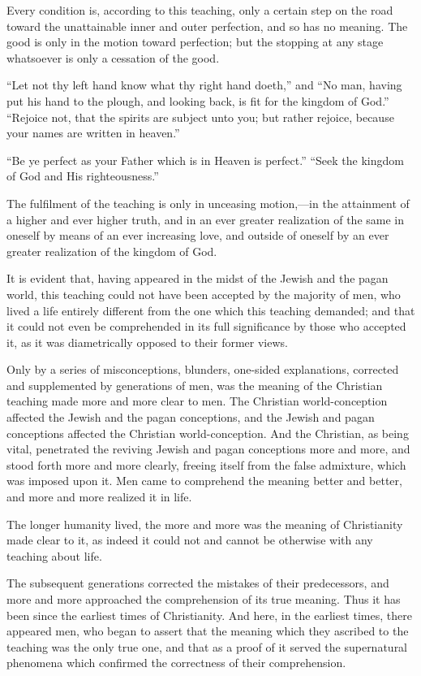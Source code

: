 \documentclass{book}
\begin{document}
Every condition is, according to this teaching, only a certain step on the road toward the unattainable inner and outer perfection, and so has no meaning. The good is only in the motion toward perfection; but the stopping at any stage whatsoever is only a cessation of the good.

“Let not thy left hand know what thy right hand doeth,” and “No man, having put his hand to the plough, and looking back, is fit for the kingdom of God.” “Rejoice not, that the spirits are subject unto you; but rather rejoice, because your names are written in heaven.”

“Be ye perfect as your Father which is in Heaven is perfect.” “Seek the kingdom of God and His righteousness.”

The fulfilment of the teaching is only in unceasing motion,—in the attainment of a higher and ever higher truth, and in an ever greater realization of the same in oneself by means of an ever increasing love, and outside of oneself by an ever greater realization of the kingdom of God.

It is evident that, having appeared in the midst of the Jewish and the pagan world, this teaching could not have been accepted by the majority of men, who lived a life entirely different from the one which this teaching demanded; and that it could not even be comprehended in its full significance by those who accepted it, as it was diametrically opposed to their former views.

Only by a series of misconceptions, blunders, one-sided explanations, corrected and supplemented by generations of men, was the meaning of the Christian teaching made more and more clear to men. The Christian world-conception affected the Jewish and the pagan conceptions, and the Jewish and pagan conceptions affected the Christian world-conception. And the Christian, as being vital, penetrated the reviving Jewish and pagan conceptions more and more, and stood forth more and more clearly, freeing itself from the false admixture, which was imposed upon it. Men came to comprehend the meaning better and better, and more and more realized it in life.

The longer humanity lived, the more and more was the meaning of Christianity made clear to it, as indeed it could not and cannot be otherwise with any teaching about life.

The subsequent generations corrected the mistakes of their predecessors, and more and more approached the comprehension of its true meaning. Thus it has been since the earliest times of Christianity. And here, in the earliest times, there appeared men, who began to assert that the meaning which they ascribed to the teaching was the only true one, and that as a proof of it served the supernatural phenomena which confirmed the correctness of their comprehension.
\end{document}

